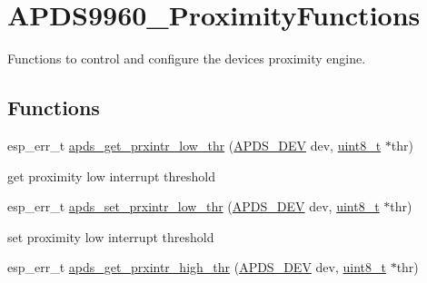 \hypertarget{group__APDS9960__ProximityFunctions}{}\section{A\+P\+D\+S9960\+\_\+\+Proximity\+Functions}
\label{group__APDS9960__ProximityFunctions}


Functions to control and configure the device\textquotesingle{}s proximity engine.  


\subsection*{Functions}
\begin{DoxyCompactItemize}
\item 
esp\+\_\+err\+\_\+t \hyperlink{group__APDS9960__ProximityFunctions_ga111701c7f135655d785c45cc1b7c408d}{apds\+\_\+get\+\_\+prxintr\+\_\+low\+\_\+thr} (\hyperlink{structAPDS9960__Driver}{A\+P\+D\+S\+\_\+\+D\+EV} dev, \hyperlink{vl53l0x__types_8h_aba7bc1797add20fe3efdf37ced1182c5}{uint8\+\_\+t} $\ast$thr)
\begin{DoxyCompactList}\small\item\em 
\begin{DoxyItemize}
\item get proximity low interrupt threshold 
\end{DoxyItemize}\end{DoxyCompactList}\item 
esp\+\_\+err\+\_\+t \hyperlink{group__APDS9960__ProximityFunctions_ga27a515a43869abcb6085faeedb527128}{apds\+\_\+set\+\_\+prxintr\+\_\+low\+\_\+thr} (\hyperlink{structAPDS9960__Driver}{A\+P\+D\+S\+\_\+\+D\+EV} dev, \hyperlink{vl53l0x__types_8h_aba7bc1797add20fe3efdf37ced1182c5}{uint8\+\_\+t} $\ast$thr)
\begin{DoxyCompactList}\small\item\em 
\begin{DoxyItemize}
\item set proximity low interrupt threshold 
\end{DoxyItemize}\end{DoxyCompactList}\item 
esp\+\_\+err\+\_\+t \hyperlink{group__APDS9960__ProximityFunctions_ga3c0730e5329f2d87a45451710d919dca}{apds\+\_\+get\+\_\+prxintr\+\_\+high\+\_\+thr} (\hyperlink{structAPDS9960__Driver}{A\+P\+D\+S\+\_\+\+D\+EV} dev, \hyperlink{vl53l0x__types_8h_aba7bc1797add20fe3efdf37ced1182c5}{uint8\+\_\+t} $\ast$thr)

\end{DoxyCompactItemize}
